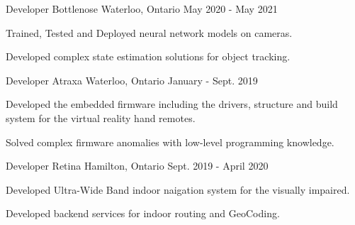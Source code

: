 
\begin{cventries}

  \cventry
    {Developer} %
    {Bottlenose} %
    {Waterloo, Ontario} %
    {May 2020 - May 2021} %
    {
      \begin{cvitems} %
        \item {Trained, Tested and Deployed neural network models on cameras.}
        \item {Developed complex state estimation solutions for object tracking.}
      \end{cvitems}
    }

  \cventry
    {Developer} %
    {Atraxa} %
    {Waterloo, Ontario} %
    {January - Sept. 2019} %
    {
      \begin{cvitems} %
        \item {Developed the embedded firmware including the drivers, structure and build system for the virtual reality hand remotes.}
        \item {Solved complex firmware anomalies with low-level programming knowledge.}
      \end{cvitems}
    }

  \cventry
    {Developer} %
    {Retina} %
    {Hamilton, Ontario} %
    {Sept. 2019 - April 2020} %
    {
      \begin{cvitems} %
        \item {Developed Ultra-Wide Band indoor naigation system for the visually impaired.}
        \item {Developed backend services for indoor routing and GeoCoding.}
      \end{cvitems}
    }


\end{cventries}
